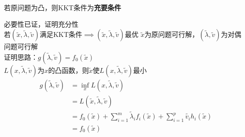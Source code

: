 \begin{theorem}
若原问题为凸，则KKT条件为\textbf{充要条件}
\end{theorem}
\begin{analysis}
    必要性已证，证明充分性\\
    若$(\tilde{x},\tilde{\lambda},\tilde{v})$满足KKT条件$\implies(\tilde{x},\tilde{\lambda},\tilde{v})$最优
    $\tilde{x}$为原问题可行解，$(\tilde{\lambda},\tilde{v})$为对偶问题可行解\\
    证明思路：$g(\tilde{\lambda},\tilde{v})=f_0(\tilde{x})$\\
    $L(x,\tilde{\lambda},\tilde{v})$为$x$的凸函数，则$\tilde{x}$使$L(x,\tilde{\lambda},\tilde{v})$最小
    \[\begin{aligned}
        g(\tilde{\lambda},\tilde{v})&=\inf_x L(x,\tilde{\lambda},\tilde{v})\\
        &=L(\tilde{x},\tilde{\lambda},\tilde{v})\\
        &=f_0(\tilde{x})+\sum_{i=1}^m\tilde{\lambda}_if_i(\tilde{x})+\sum_{i=1}^p\tilde{v_i}h_i(\tilde{x})\\
        &=f_0(\tilde{x})
    \end{aligned}\]
\end{analysis}

